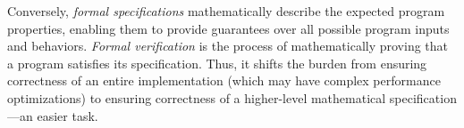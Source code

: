 Conversely, \emph{formal specifications} 
mathematically describe the expected program properties, 
enabling them to provide guarantees over all possible program inputs and behaviors. 
\emph{Formal verification} is the process of mathematically proving that a program satisfies its specification.
Thus, it shifts the burden from ensuring correctness of an entire implementation 
(which may have complex performance optimizations)
to ensuring correctness of a higher-level mathematical specification---an easier task. 

